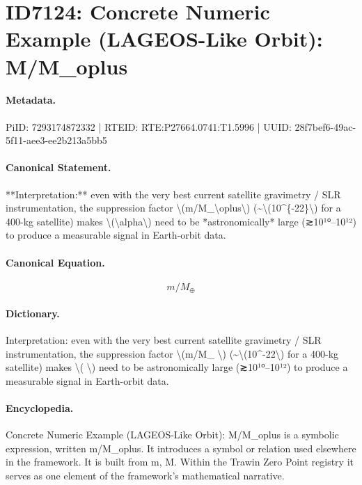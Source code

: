 \section*{ID7124: Concrete Numeric Example (LAGEOS-Like Orbit): M/M\_oplus}
\paragraph{Metadata.}
PiID: 7293174872332 | RTEID: RTE:P27664.0741:T1.5996 | UUID: 28f7bef6-49ac-5f11-aee3-ee2b213a5bb5

\paragraph{Canonical Statement.}
**Interpretation:** even with the very best current satellite gravimetry / SLR instrumentation, the suppression factor \textbackslash{}(m/M\_\textbackslash{}oplus\textbackslash{}) (\textasciitilde{}\textbackslash{}(10\textasciicircum{}\{-22\}\textbackslash{}) for a 400-kg satellite) makes \textbackslash{}(\textbackslash{}alpha\textbackslash{}) need to be *astronomically* large (≳10¹⁰–10¹²) to produce a measurable signal in Earth-orbit data.

\paragraph{Canonical Equation.}
\[
m/M_\oplus
\]

\paragraph{Dictionary.}
Interpretation: even with the very best current satellite gravimetry / SLR instrumentation, the suppression factor \textbackslash{}(m/M\_ \textbackslash{}) (\textasciitilde{}\textbackslash{}(10\textasciicircum{}-22\textbackslash{}) for a 400-kg satellite) makes \textbackslash{}( \textbackslash{}) need to be astronomically large (≳10¹⁰–10¹²) to produce a measurable signal in Earth-orbit data.

\paragraph{Encyclopedia.}
Concrete Numeric Example (LAGEOS-Like Orbit): M/M\_oplus is a symbolic expression, written m/M\_oplus. It introduces a symbol or relation used elsewhere in the framework. It is built from m, M. Within the Trawin Zero Point registry it serves as one element of the framework's mathematical narrative.
